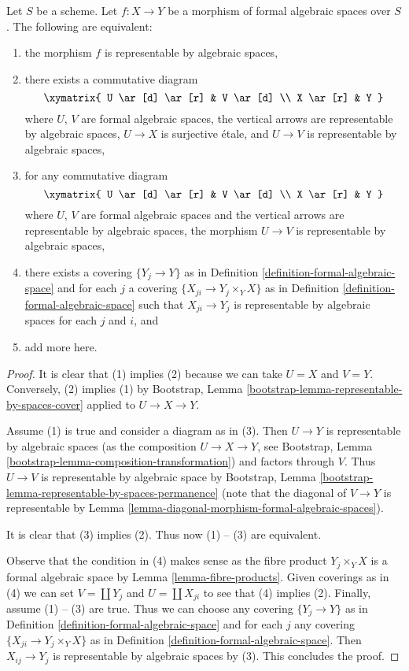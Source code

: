 \begin{lemma}
\label{lemma-representable-by-algebraic-spaces-local}
Let $S$ be a scheme. Let $f : X \to Y$ be a morphism of formal algebraic
spaces over $S$. The following are equivalent:
\begin{enumerate}
\item the morphism $f$ is representable by algebraic spaces,
\item there exists a commutative diagram
$$
\xymatrix{
U \ar[d] \ar[r] & V \ar[d] \\
X \ar[r] & Y
}
$$
where $U$, $V$ are formal algebraic spaces, the vertical arrows are
representable by algebraic spaces, $U \to X$
is surjective \'etale, and $U \to V$ is representable by algebraic spaces,
\item for any commutative diagram
$$
\xymatrix{
U \ar[d] \ar[r] & V \ar[d] \\
X \ar[r] & Y
}
$$
where $U$, $V$ are formal algebraic spaces and the vertical arrows are
representable by algebraic spaces, the morphism $U \to V$ is
representable by algebraic spaces,
\item there exists a covering $\{Y_j \to Y\}$ as in
Definition \ref{definition-formal-algebraic-space}
and for each $j$ a covering $\{X_{ji} \to Y_j \times_Y X\}$ as in
Definition \ref{definition-formal-algebraic-space} such that
$X_{ji} \to Y_j$ is representable by algebraic spaces for each $j$ and $i$, and
\item add more here.
\end{enumerate}
\end{lemma}

\begin{proof}
It is clear that (1) implies (2) because we can take $U = X$ and $V = Y$.
Conversely, (2) implies (1) by
Bootstrap, Lemma \ref{bootstrap-lemma-representable-by-spaces-cover}
applied to $U \to X \to Y$.

\medskip\noindent
Assume (1) is true and consider a diagram as in (3).
Then $U \to Y$ is representable by algebraic spaces
(as the composition $U \to X \to Y$, see
Bootstrap, Lemma \ref{bootstrap-lemma-composition-transformation})
and factors through $V$. Thus $U \to V$ is representable by
algebraic space by Bootstrap, Lemma
\ref{bootstrap-lemma-representable-by-spaces-permanence}
(note that the diagonal of $V \to Y$ is representable by
Lemma \ref{lemma-diagonal-morphism-formal-algebraic-spaces}).

\medskip\noindent
It is clear that (3) implies (2). Thus now (1) -- (3) are equivalent.

\medskip\noindent
Observe that the condition in (4) makes sense as the fibre product
$Y_j \times_Y X$ is a formal algebraic space by
Lemma \ref{lemma-fibre-products}. Given coverings as in (4) we can set
$V = \coprod Y_j$ and $U = \coprod X_{ji}$ to see that
(4) implies (2). Finally, assume (1) -- (3) are true.
Thus we can choose any covering $\{Y_j \to Y\}$ as in
Definition \ref{definition-formal-algebraic-space}
and for each $j$ any covering $\{X_{ji} \to Y_j \times_Y X\}$ as in
Definition \ref{definition-formal-algebraic-space}.
Then $X_{ij} \to Y_j$ is representable by algebraic spaces by (3).
This concludes the proof.
\end{proof}

